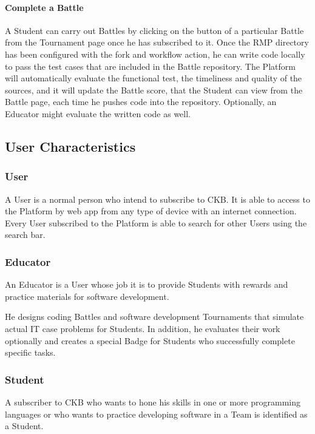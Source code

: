 \paragraph{Complete a Battle}
A Student can carry out Battles by clicking on the button of a particular Battle from the Tournament page once he has subscribed to it. Once the RMP directory has been configured with the fork and workflow action, he can write code 
locally to pass the test cases that are included in the Battle repository. The Platform will automatically evaluate the functional test, the timeliness and quality of the sources, and it will update the Battle score, that the Student 
can view from the Battle page, each time he pushes code into the repository. Optionally, an Educator might evaluate the written code as well.
\newpage

\subsection{User Characteristics}
\subsubsection{User}
A User is a normal person who intend to subscribe to CKB. It is able to access to the Platform by web app from any type of device with an internet connection.\\
Every User subscribed to the Platform is able to search for other Users using the search bar.

\subsubsection{Educator}
An Educator is a User whose job it is to provide Students with rewards and practice materials for software development.

He designs coding Battles and software development Tournaments that simulate actual IT case problems for Students. In addition, he evaluates their work optionally and creates a special Badge for Students who successfully complete 
specific tasks.

\subsubsection{Student}
A subscriber to CKB who wants to hone his skills in one or more programming languages or who wants to practice developing software in a Team is identified as a Student.

